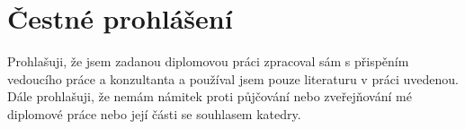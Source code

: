 \chapter*{Čestné prohlášení}

Prohlašuji, že jsem zadanou diplomovou práci zpracoval sám s přispěním
vedoucího práce a konzultanta a používal jsem pouze literaturu v práci
uvedenou. Dále prohlašuji, že nemám námitek proti půjčování nebo zveřejňování
mé diplomové práce nebo její části se souhlasem katedry.

\vspace{.5in}
\par\noindent\makebox[1.5in][c]{\dotfill}\hfill\makebox[3.0in][c]{\dotfill}
\par\noindent{}\hfill{}
